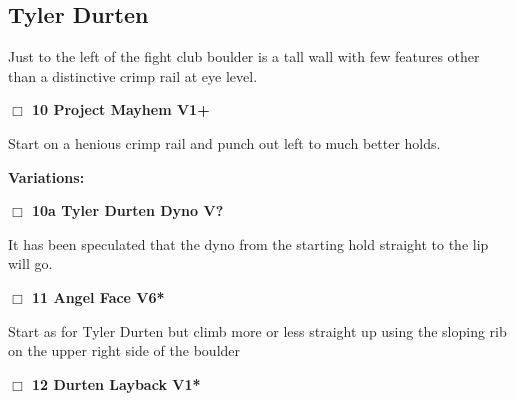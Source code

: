 \begin{multicols}{2}
\needspace{10em}
\subsection*{Tyler Durten}\label{bf:Tyler Durten}

Just to the left of the fight club boulder is a tall wall with few features other than a distinctive crimp rail at eye level.\\



\needspace{2em}
\label{rt:Project Mayhem}
\colorbox{green!20}{
\parbox{0.95\linewidth}{
\hspace{-1ex}\textbf{$\Box$
10 Project Mayhem V1+  
}}}
\begin{adjustwidth}{1.3em}{}			

Start on a henious crimp rail and punch out left to much better holds.
\end{adjustwidth}


\begin{adjustwidth}{0.5cm}{}				
\needspace{4em}
\textbf{Variations:} \newline

\needspace{2em}
\label{vr:Tyler Durten Dyno}
\colorbox{black!20}{
\parbox{0.95\linewidth}{
\hspace{-1ex}\textbf{$\Box$
10a Tyler Durten Dyno V?  
}}}
\begin{adjustwidth}{1.3em}{}			

It has been speculated that the dyno from the starting hold straight to the lip will go.
\end{adjustwidth}



\end{adjustwidth}


\needspace{2em}
\label{rt:Angel Face}
\colorbox{RoyalBlue!20}{
\parbox{0.95\linewidth}{
\hspace{-1ex}\textbf{$\Box$
11 Angel Face V6*  
}}}
\begin{adjustwidth}{1.3em}{}			

Start as for Tyler Durten but climb more or less straight up using the sloping rib on the upper right side of the boulder
\end{adjustwidth}




\needspace{2em}
\label{rt:Durten Layback}
\colorbox{green!20}{
\parbox{0.95\linewidth}{
\hspace{-1ex}\textbf{$\Box$
12 Durten Layback V1*  
}}}
\begin{adjustwidth}{1.3em}{}			


\end{adjustwidth}
\end{multicols}
